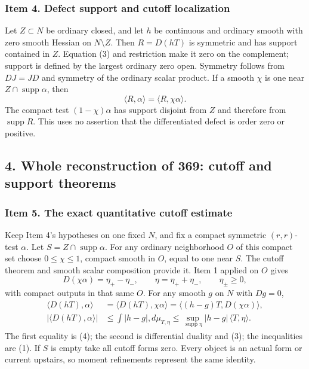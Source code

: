 \documentclass[11pt]{article}
\begin{document}
\subsubsection{Item 4. Defect support and cutoff localization}

Let \(Z\subset N\) be ordinary closed, and let \(h\) be continuous and ordinary smooth with zero smooth Hessian on \(N\setminus Z\). Then \(R=D(hT)\) is symmetric and has support contained in \(Z\). Equation (3) and restriction make it zero on the complement; support is defined by the largest ordinary zero open. Symmetry follows from \(DJ=JD\) and symmetry of the ordinary scalar product. If a smooth \(\chi\) is one near \(Z\cap\operatorname{supp}\alpha\), then
\[
 \langle R,\alpha\rangle=\langle R,\chi\alpha\rangle.\tag{4}
\]
The compact test \((1-\chi)\alpha\) has support disjoint from \(Z\) and therefore from \(\operatorname{supp}R\). This uses no assertion that the differentiated defect is order zero or positive.

\subsection{4. Whole reconstruction of 369: cutoff and support theorems}

\subsubsection{Item 5. The exact quantitative cutoff estimate}

Keep Item 4's hypotheses on one fixed \(N\), and fix a compact symmetric \((r,r)\)-test \(\alpha\). Let \(S=Z\cap\operatorname{supp}\alpha\). For any ordinary neighborhood \(O\) of this compact set choose \(0\leq\chi\leq1\), compact smooth in \(O\), equal to one near \(S\). The cutoff theorem and smooth scalar composition provide it. Item 1 applied on \(O\) gives
\[
 D(\chi\alpha)=\eta_+-\eta_-,\qquad\eta=\eta_++\eta_-,
 \qquad \eta_\pm\geq0,
 \tag{5}
\]
with compact outputs in that same \(O\). For any smooth \(g\) on \(N\) with \(Dg=0\),
\[
 \begin{split}
 \langle D(hT),\alpha\rangle
 &=\langle D(hT),\chi\alpha\rangle
 =\langle(h-g)T,D(\chi\alpha)\rangle,\\
 |\langle D(hT),\alpha\rangle|
 &\leq\int|h-g|,d\mu_{T,\eta}
 \leq\sup_{\operatorname{supp}\eta}|h-g|\,\langle T,\eta\rangle.
 \end{split}\tag{6}
\]
The first equality is (4); the second is differential duality and (3); the inequalities are (1). If \(S\) is empty take all cutoff forms zero. Every object is an actual form or current upstairs, so moment refinements represent the same identity.
\end{document}
